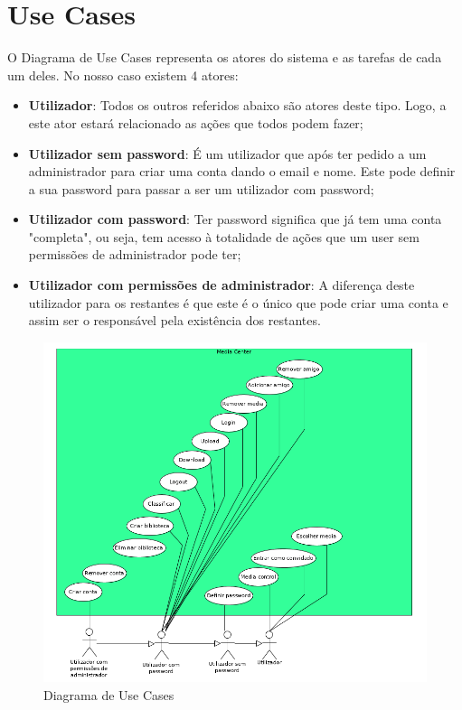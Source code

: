 \documentclass[a4paper]{report}
\begin{document}
\chapter{Use Cases}

O Diagrama de Use Cases representa os atores do sistema e as tarefas de cada um
deles. No nosso caso existem 4 atores:
\begin{itemize}
    \item \textbf{Utilizador}: Todos os outros referidos abaixo são atores deste
        tipo. Logo, a este ator estará relacionado as ações que todos podem
        fazer;
    \item \textbf{Utilizador sem password}: É um utilizador que após ter pedido
        a um administrador para criar uma conta dando o email e nome. Este pode
        definir a sua password para passar a ser um utilizador com password;
    \item \textbf{Utilizador com password}: Ter password significa que já tem
        uma conta "completa", ou seja, tem acesso à totalidade de ações que um
        user sem permissões de administrador pode ter;
    \item \textbf{Utilizador com permissões de administrador}: A diferença deste 
        utilizador para os restantes é que este é o único que pode criar uma
        conta e assim ser o responsável pela existência dos restantes.
\end{itemize}

\begin{figure}[H]
	\centering 
    \includegraphics[width=\textwidth]{images/UseCases.png}  
    \caption{Diagrama de Use Cases}
\end{figure}
\end{document}
